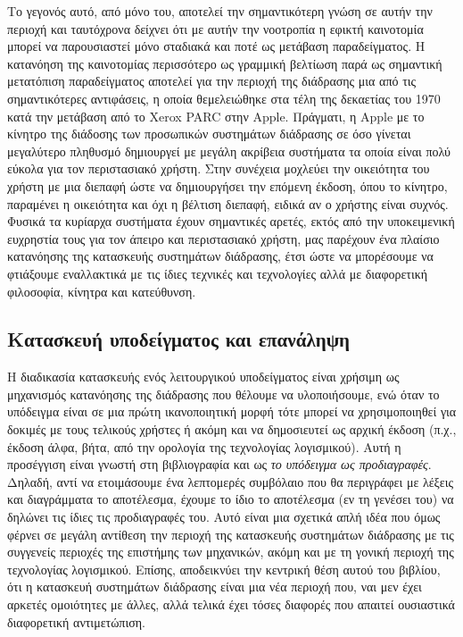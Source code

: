 \documentclass[
]{article}
\begin{document}
Το γεγονός αυτό, από μόνο του, αποτελεί την σημαντικότερη γνώση σε αυτήν
την περιοχή και ταυτόχρονα δείχνει ότι με αυτήν την νοοτροπία η εφικτή
καινοτομία μπορεί να παρουσιαστεί μόνο σταδιακά και ποτέ ως μετάβαση
παραδείγματος. Η κατανόηση της καινοτομίας περισσότερο ως γραμμική
βελτίωση παρά ως σημαντική μετατόπιση παραδείγματος αποτελεί για την
περιοχή της διάδρασης μια από τις σημαντικότερες αντιφάσεις, η οποία
θεμελειώθηκε στα τέλη της δεκαετίας του 1970 κατά την μετάβαση από το
Xerox PARC στην Apple. Πράγματι, η Apple με το κίνητρο της διάδοσης των
προσωπικών συστημάτων διάδρασης σε όσο γίνεται μεγαλύτερο πληθυσμό
δημιουργεί με μεγάλη ακρίβεια συστήματα τα οποία είναι πολύ εύκολα για
τον περιστασιακό χρήστη. Στην συνέχεια μοχλεύει την οικειότητα του
χρήστη με μια διεπαφή ώστε να δημιουργήσει την επόμενη έκδοση, όπου το
κίνητρο, παραμένει η οικειότητα και όχι η βέλτιση διεπαφή, ειδικά αν ο
χρήστης είναι συχνός. Φυσικά τα κυρίαρχα συστήματα έχουν σημαντικές
αρετές, εκτός από την υποκειμενική ευχρηστία τους για τον άπειρο και
περιστασιακό χρήστη, μας παρέχουν ένα πλαίσιο κατανόησης της κατασκευής
συστημάτων διάδρασης, έτσι ώστε να μπορέσουμε να φτιάξουμε εναλλακτικά
με τις ίδιες τεχνικές και τεχνολογίες αλλά με διαφορετική φιλοσοφία,
κίνητρα και κατεύθυνση.

\hypertarget{ux3baux3b1ux3c4ux3b1ux3c3ux3baux3b5ux3c5ux3ae-ux3c5ux3c0ux3bfux3b4ux3b5ux3afux3b3ux3bcux3b1ux3c4ux3bfux3c2-ux3baux3b1ux3b9-ux3b5ux3c0ux3b1ux3bdux3acux3bbux3b7ux3c8ux3b7}{%
\subsection{Κατασκευή υποδείγματος και
επανάληψη}\label{ux3baux3b1ux3c4ux3b1ux3c3ux3baux3b5ux3c5ux3ae-ux3c5ux3c0ux3bfux3b4ux3b5ux3afux3b3ux3bcux3b1ux3c4ux3bfux3c2-ux3baux3b1ux3b9-ux3b5ux3c0ux3b1ux3bdux3acux3bbux3b7ux3c8ux3b7}}

Η διαδικασία κατασκευής ενός λειτουργικού υποδείγματος είναι χρήσιμη ως
μηχανισμός κατανόησης της διάδρασης που θέλουμε να υλοποιήσουμε, ενώ
όταν το υπόδειγμα είναι σε μια πρώτη ικανοποιητική μορφή τότε μπορεί να
χρησιμοποιηθεί για δοκιμές με τους τελικούς χρήστες ή ακόμη και να
δημοσιευτεί ως αρχική έκδοση (π.χ., έκδοση άλφα, βήτα, από την ορολογία
της τεχνολογίας λογισμικού). Αυτή η προσέγγιση είναι γνωστή στη
βιβλιογραφία και ως \emph{το υπόδειγμα ως προδιαγραφές}. Δηλαδή, αντί να
ετοιμάσουμε ένα λεπτομερές συμβόλαιο που θα περιγράφει με λέξεις και
διαγράμματα το αποτέλεσμα, έχουμε το ίδιο το αποτέλεσμα (εν τη γενέσει
του) να δηλώνει τις ίδιες τις προδιαγραφές του. Αυτό είναι μια σχετικά
απλή ιδέα που όμως φέρνει σε μεγάλη αντίθεση την περιοχή της κατασκευής
συστημάτων διάδρασης με τις συγγενείς περιοχές της επιστήμης των
μηχανικών, ακόμη και με τη γονική περιοχή της τεχνολογίας λογισμικού.
Επίσης, αποδεικνύει την κεντρική θέση αυτού του βιβλίου, ότι η κατασκευή
συστημάτων διάδρασης είναι μια νέα περιοχή που, ναι μεν έχει αρκετές
ομοιότητες με άλλες, αλλά τελικά έχει τόσες διαφορές που απαιτεί
ουσιαστικά διαφορετική αντιμετώπιση.
\end{document}
